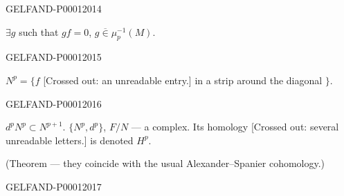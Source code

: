 \begin{GelfandAdjacentEvidence}{GELFAND-P000120}{14}

$\exists g$ such that $gf=0$, $g\overline{\in}\mu_p^{-1}(M)$.
\end{GelfandAdjacentEvidence}
\begin{GelfandAdjacentEvidence}{GELFAND-P000120}{15}

$N^p=\{f$ [Crossed out: an unreadable entry.] in a strip around the diagonal $\}$.
\end{GelfandAdjacentEvidence}
\begin{GelfandAdjacentEvidence}{GELFAND-P000120}{16}

$d^pN^p\subset N^{p+1}$.
$\{N^p,d^p\}$, $F/N$ — a complex.
Its homology [Crossed out: several unreadable letters.] is denoted $H^p$.

(Theorem — they coincide with the usual Alexander–Spanier cohomology.)
\end{GelfandAdjacentEvidence}
\begin{GelfandAdjacentEvidence}{GELFAND-P000120}{17}


\end{GelfandAdjacentEvidence}



